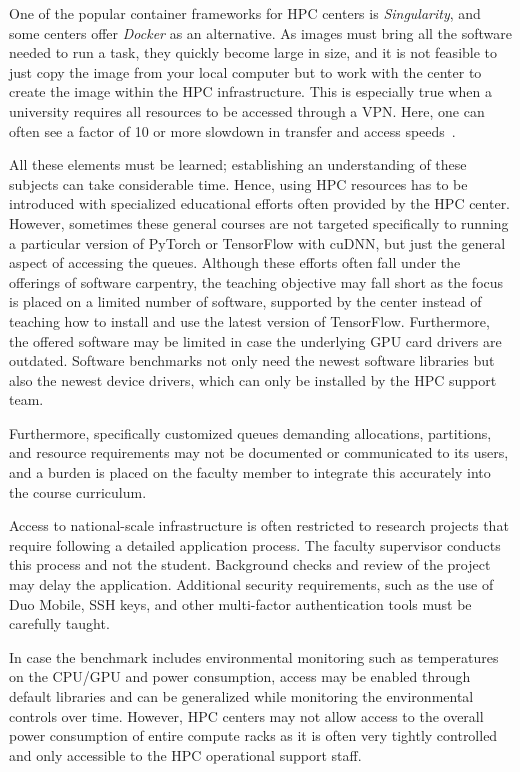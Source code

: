 \documentclass[utf8]{FrontiersinVancouver} %
\begin{document}
One of the popular container frameworks for HPC centers is {\em Singularity}, and some centers offer {\em Docker} as an alternative. As images must bring all the software needed to run a task, they quickly become large in size, and it is not feasible to just copy the image from your local computer but to work with the center to create the image within the HPC infrastructure. This is especially true when a university requires all resources to be accessed through a VPN. Here, one can often see a factor of 10 or more slowdown in transfer and access speeds~\cite{tovar}.

All these elements must be learned; establishing an understanding of these subjects can take considerable time. Hence, using HPC resources has to be introduced with specialized educational efforts often provided by the HPC center. However, sometimes these general courses are not targeted specifically to running a particular version of PyTorch or TensorFlow with cuDNN, but just the general aspect of accessing the queues. Although these efforts often fall under the offerings of software carpentry, the teaching objective may fall short as the focus is placed on a limited number of software, supported by the center instead of teaching how to install and use the latest version of TensorFlow. Furthermore, the offered software may be limited in case the underlying GPU card drivers are outdated. Software benchmarks not only need the newest software libraries but also the newest device drivers, which can only be installed by the HPC support team.

Furthermore, specifically customized queues demanding allocations, partitions, and resource requirements may not be documented or communicated to its users, and a burden is placed on the faculty member to integrate this accurately into the course curriculum.

Access to national-scale infrastructure is often restricted to research projects that require following a detailed application process. The faculty supervisor conducts this process and not the student. Background checks and review of the project may delay the application. Additional security requirements, such as the use of Duo Mobile, SSH keys, and other multi-factor authentication tools must be carefully taught.

In case the benchmark includes environmental monitoring such as temperatures on the CPU/GPU and power consumption, access may be enabled through default libraries and can be generalized while monitoring the environmental controls over time. However, HPC centers may not allow access to the overall power consumption of entire compute racks as it is often very tightly controlled and only accessible to the HPC operational support staff.
\end{document}
